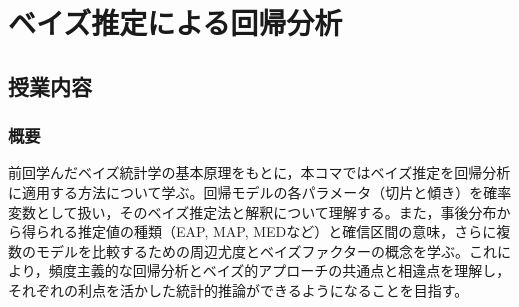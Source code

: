 \section{ベイズ推定による回帰分析}
\label{b26_bayesian_regression}

\subsection{授業内容}

\subsubsection{概要}
前回学んだベイズ統計学の基本原理をもとに，本コマではベイズ推定を回帰分析に適用する方法について学ぶ。回帰モデルの各パラメータ（切片と傾き）を確率変数として扱い，そのベイズ推定法と解釈について理解する。また，事後分布から得られる推定値の種類（EAP, MAP, MEDなど）と確信区間の意味，さらに複数のモデルを比較するための周辺尤度とベイズファクターの概念を学ぶ。これにより，頻度主義的な回帰分析とベイズ的アプローチの共通点と相違点を理解し，それぞれの利点を活かした統計的推論ができるようになることを目指す。


